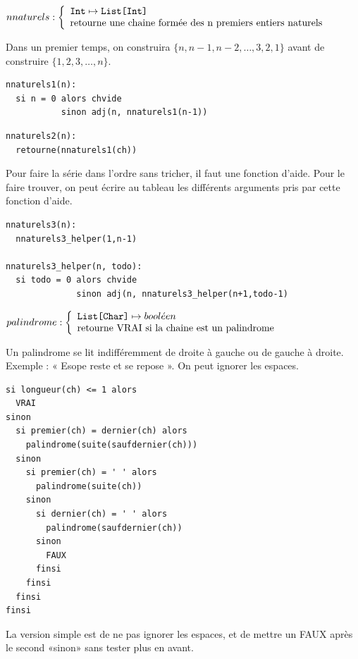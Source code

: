 \documentclass[10pt]{article}\usepackage[correction,nu]{esial}
\begin{document}
\begin{Question}
  $nnaturels: \left\{
    \begin{array}{l}
      \text{\texttt{Int}}\mapsto \text{\texttt{List[Int]}}\\
      \text{retourne une chaine formée des n premiers entiers naturels}
    \end{array}\right.$  
  
  Dans un premier temps, on construira $\{n, n-1, n-2, \ldots, 3, 2, 1\}$ avant
  de construire $\{1, 2, 3, \ldots, n\}$.
\end{Question}
\begin{Reponse}
  \begin{Verbatim}[label=Version simple qui donne la liste à l'envers]
nnaturels1(n):
  si n = 0 alors chvide
           sinon adj(n, nnaturels1(n-1))
  \end{Verbatim}

  \begin{Verbatim}[label=Version trichée qui donne la chaine à l'endroit:]
nnaturels2(n):
  retourne(nnaturels1(ch))
  \end{Verbatim}
  
  Pour faire la série dans l'ordre sans tricher, il faut une fonction
  d'aide. Pour le faire trouver, on peut écrire au tableau les différents
  arguments pris par cette fonction d'aide.
  \begin{Verbatim}[label=Version avec helper:]
nnaturels3(n):
  nnaturels3_helper(1,n-1)    

nnaturels3_helper(n, todo):
  si todo = 0 alors chvide
              sinon adj(n, nnaturels3_helper(n+1,todo-1)
  \end{Verbatim}
\end{Reponse}


\begin{Question}
  $palindrome: \left\{
    \begin{array}{l}
      \text{\texttt{List[Char]}}\mapsto bool\acute{e}en\\
      \text{retourne VRAI si la chaine est un palindrome}
    \end{array}\right.$  

  Un palindrome se lit indifféremment de droite à gauche ou de gauche à droite.
  Exemple : « Esope reste et se repose ». On peut ignorer les espaces.
\end{Question}
\begin{Reponse}
  \begin{Verbatim}[label=palindrome(ch)]
si longueur(ch) <= 1 alors 
  VRAI
sinon
  si premier(ch) = dernier(ch) alors
    palindrome(suite(saufdernier(ch)))
  sinon 
    si premier(ch) = ' ' alors
      palindrome(suite(ch))
    sinon 
      si dernier(ch) = ' ' alors
        palindrome(saufdernier(ch))
      sinon
        FAUX
      finsi
    finsi    
  finsi
finsi    
  \end{Verbatim}
  La version simple est de ne pas ignorer les espaces, et de
  mettre un FAUX après le second «sinon» sans tester plus en avant.
\end{Reponse}
\end{document}
